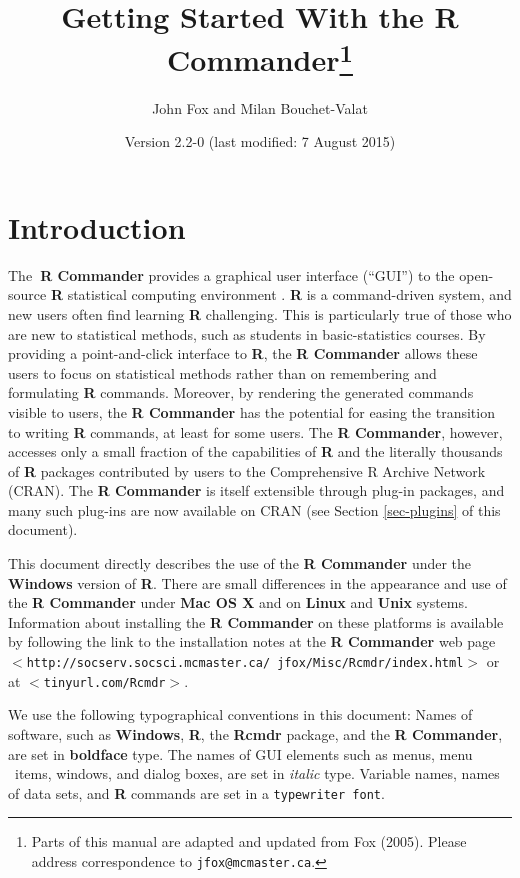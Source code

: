 \documentclass{article}%
\begin{document}
\title{Getting Started With the R Commander\thanks{Parts of this manual are adapted
and updated from Fox (2005). Please address correspondence to
\texttt{jfox@mcmaster.ca}. }}
\author{John Fox and Milan Bouchet-Valat}
\date{Version 2.2-0 (last modified: 7 August 2015)}
\maketitle

\section{Introduction}

The\textbf{\ R Commander} \citep{Fox05} provides a graphical user
interface (\textquotedblleft GUI\textquotedblright) to the open-source
\textbf{R } statistical computing environment \citep{RCore15}. \textbf{R} is a command-driven system, and new users
often find learning \textbf{R} challenging. This is particularly true of those
who are new to statistical methods, such as students in basic-statistics
courses. By providing a point-and-click interface to \textbf{R}, the \textbf{R
Commander} allows these users to focus on statistical methods rather than on
remembering and formulating \textbf{R} commands. Moreover, by rendering the
generated commands visible to users, the \textbf{R Commander} has the
potential for easing the transition to writing \textbf{R} commands, at least
for some users. The \textbf{R Commander}, however, accesses only a small
fraction of the capabilities of \textbf{R} and the literally thousands of
\textbf{R} packages contributed by users to the Comprehensive R Archive
Network (CRAN). The \textbf{R Commander} is itself extensible through plug-in
packages, and many such plug-ins are now available on CRAN (see Section
\ref{sec-plugins} of this document).

This document directly describes the use of the \textbf{R Commander} under the
\textbf{Windows} version of \textbf{R}. There are small differences in the
appearance and use of the \textbf{R Commander} under \textbf{Mac OS X} and on
\textbf{Linux} and \textbf{Unix} systems. Information about installing the
\textbf{R Commander} on these platforms is available by following the link to
the installation notes at the \textbf{R Commander} web page
$<$\texttt{http://socserv.socsci.mcmaster.ca/ jfox/Misc/Rcmdr/index.html}$>$ or at
$<$\texttt{tinyurl.com/Rcmdr}$>$.

We use the following typographical conventions in this document: Names of
software, such as \textbf{Windows}, \textbf{R}, the \textbf{Rcmdr} package,
and the \textbf{R Commander}, are set in \textbf{boldface} type. The names of
GUI elements such as menus, menu \ items, windows, and dialog boxes, are set
in \emph{italic} type. Variable names, names of data sets, and \textbf{R}
commands are set in a \texttt{typewriter font}.
\end{document}
